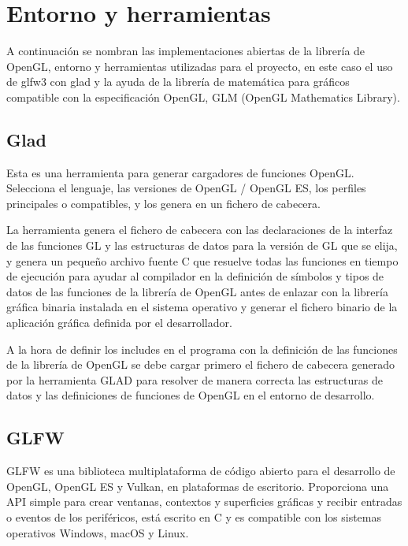 \documentclass[a4paper, 17pt]{book}
\begin{document}
\section{Entorno y herramientas} 
\label{sec:Entorno}

A continuación se nombran las implementaciones abiertas de la librería de OpenGL, entorno y herramientas 
utilizadas para el proyecto, en este caso el uso de glfw3 con glad y la ayuda de la librería de matemática
para gráficos compatible con la especificación OpenGL, GLM (OpenGL Mathematics Library).

\subsection{Glad} 
\label{subsec:Glad}

Esta es una herramienta para generar cargadores de funciones OpenGL. Selecciona el lenguaje, las versiones
de OpenGL / OpenGL ES, los perfiles principales o compatibles, y los genera en un fichero de cabecera.

\vspace{1mm} %

La herramienta genera el fichero de cabecera con las declaraciones de la interfaz de las funciones GL y
las estructuras de datos para la versión de GL que se elija, y genera un pequeño archivo fuente C que
resuelve todas las funciones en tiempo de ejecución para ayudar al compilador en la definición de
símbolos y tipos de datos de las funciones de la librería de OpenGL antes de enlazar con la librería
gráfica binaria instalada en el sistema operativo y generar el fichero binario de la aplicación gráfica
definida por el desarrollador.

\vspace{1mm} %

A la hora de definir los includes en el programa con la definición de las funciones de la librería de
OpenGL se debe cargar primero el fichero de cabecera generado por la herramienta GLAD para resolver de
manera correcta las estructuras de datos y las definiciones de funciones de OpenGL en el entorno de
desarrollo.

\subsection{GLFW} 
\label{subsec:GLFW}

GLFW es una biblioteca multiplataforma de código abierto para el desarrollo de OpenGL, OpenGL ES y Vulkan,
en plataformas de escritorio. Proporciona una API simple para crear ventanas, contextos y superficies
gráficas y recibir entradas o eventos de los periféricos, está escrito en C y es compatible con los sistemas
operativos Windows, macOS y Linux.
\end{document}
